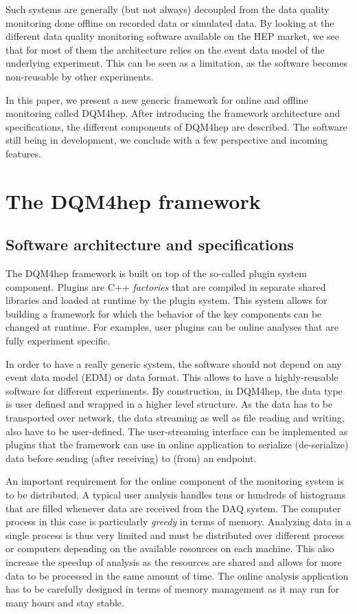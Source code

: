 \documentclass{webofc}
\begin{document}
Such systems are generally (but not always) decoupled from the data quality monitoring done offline on recorded data or simulated data. By looking at the different data quality monitoring software available on the HEP market, we see that for most of them the architecture relies on the event data model of the underlying experiment. This can be seen as a limitation, as the software becomes non-reusable by other experiments.

In this paper, we present a new generic framework for online and offline monitoring called DQM4hep. After introducing the framework architecture and specifications, the different components of DQM4hep are described. The software still being in development, we conclude with a few perspective and incoming features.

\section{The DQM4hep framework}
\label{sec:framework}

\subsection{Software architecture and specifications}
\label{subsec:arch}

The DQM4hep framework is built on top of the so-called plugin system component. Plugins are C++ \textit{factories} that are compiled in separate shared libraries and loaded at runtime by the plugin system. This system allows for building a framework for which the behavior of the key components can be changed at runtime. For examples, user plugins can be online analyses that are fully experiment specific.

In order to have a really generic system, the software should not depend on any event data model (EDM) or data format. This allows to have a highly-reusable software for different experiments. By construction, in DQM4hep, the data type is user defined and wrapped in a higher level structure. As the data has to be transported over network, the data streaming as well as file reading and writing, also have to be user-defined. The user-streaming interface can be implemented as plugins that the framework can use in online application to serialize (de-serialize) data before sending (after receiving) to (from) an endpoint.

An important requirement for the online component of the monitoring system is to be distributed. A typical user analysis handles tens or hundreds of histograms that are filled whenever data are received from the DAQ system. The computer process in this case is particularly \textit{greedy} in terms of memory. Analyzing data in a single process is thus very limited and must be distributed over different process or computers depending on the available resources on each machine. This also increase the speedup of analysis as the resources are shared and allows for more data to be processed in the same amount of time. The online analysis application has to be carefully designed in terms of memory management as it may run for many hours and stay stable.
\end{document}
